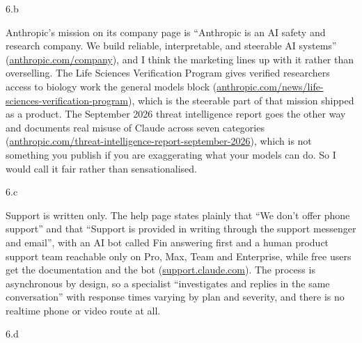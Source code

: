 \LARGE
6.b
\normalsize

\begin{answer}
  Anthropic's mission on its company page is ``Anthropic is an AI safety and research company. We
  build reliable, interpretable, and steerable AI systems''
  (\href{https://www.anthropic.com/company}{anthropic.com/company}), and I think the marketing lines
  up with it rather than overselling. The Life Sciences Verification Program gives verified
  researchers access to biology work the general models block
  (\href{https://www.anthropic.com/news/life-sciences-verification-program}{anthropic.com/news/life-sciences-verification-program}),
  which is the steerable part of that mission shipped as a product. The September 2026 threat
  intelligence report goes the other way and documents real misuse of Claude across seven categories
  (\href{https://www.anthropic.com/threat-intelligence-report-september-2026}{anthropic.com/threat-intelligence-report-september-2026}),
  which is not something you publish if you are exaggerating what your models can do. So I would
  call it fair rather than sensationalised.
\end{answer}

\LARGE
6.c
\normalsize

\begin{answer}
  Support is written only. The help page states plainly that ``We don't offer phone support'' and
  that ``Support is provided in writing through the support messenger and email'', with an AI bot
  called Fin answering first and a human product support team reachable only on Pro, Max, Team and
  Enterprise, while free users get the documentation and the bot
  (\href{https://support.claude.com/en/articles/9015913-how-to-get-support}{support.claude.com}).
  The process is asynchronous by design, so a specialist ``investigates and replies in the same
  conversation'' with response times varying by plan and severity, and there is no realtime phone or
  video route at all. 
\end{answer}

\LARGE
6.d
\normalsize

